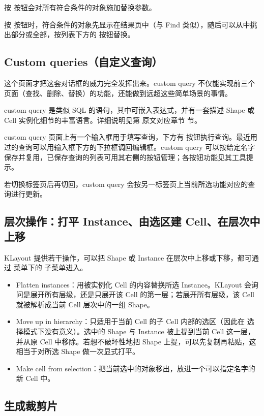 按  按钮会对所有符合条件的对象施加替换参数。

按  按钮时，符合条件的对象先显示在结果页中（与 Find 类似），随后可以从中挑出部分或全部，按列表下方的  按钮替换。

\subsection{Custom queries（自定义查询）}

这个页面才把这套对话框的威力完全发挥出来。custom query 不仅能实现前三个页面（查找、删除、替换）的功能，还能做到远超这些简单场景的事情。

custom query 是类似 SQL 的语句，其中可嵌入表达式，并有一套描述 Shape 或 Cell 实例化细节的丰富语言。详细说明见第 原文对应章节 节。

custom query 页面上有一个输入框用于填写查询，下方有  按钮执行查询。最近用过的查询可以用输入框下方的下拉框调回编辑框。custom query 可以按给定名字保存并复用，已保存查询的列表可用其右侧的按钮管理；各按钮功能见其工具提示。

若切换标签页后再切回，custom query 会按另一标签页上当前所选功能对应的查询进行更新。

\subsection{层次操作：打平 Instance、由选区建 Cell、在层次中上移}\label{sec:hier_ops}

KLayout 提供若干操作，可以把 Shape 或 Instance 在层次中上移或下移，都可通过  菜单下的  子菜单进入。

\begin{itemize}
\item Flatten instances：用被实例化 Cell 的内容替换所选 Instance。KLayout 会询问是展开所有层级，还是只展开该 Cell 的第一层；若展开所有层级，该 Cell 就被解析成当前 Cell 层次中的一组 Shape。
\item Move up in hierarchy：只适用于当前 Cell 的子 Cell 内部的选区（因此在  选择模式下没有意义）。选中的 Shape 与 Instance 被上提到当前 Cell 这一层，并从原 Cell 中移除。若想不破坏性地把 Shape 上提，可以先复制再粘贴，这相当于对所选 Shape 做一次显式打平。
\item Make cell from selection：把当前选中的对象移出，放进一个可以指定名字的新 Cell 中。
\end{itemize}

\subsection{生成裁剪片}\label{sec:clip}

